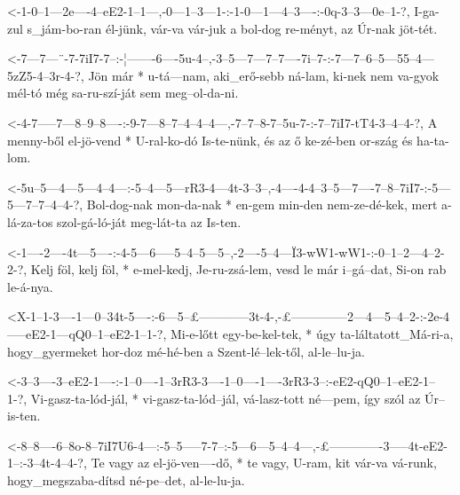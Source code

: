 
  {<-1-0--1---2e----4--eE2-1--1---,-0---1--3---1-:-1-0---1---4--3----:-0q-3--3---0e--1-?,}
  {  I-ga-zul s_jám-bo-ran él-jünk, vár-va vár-juk a bol-dog re-ményt, az Úr-nak jöt-tét.}

  {<-7---7---¨-7-7iI7-7--:-¦-------6----5u-4--,-3--5---7---7--7----7i--7-:-7---7--6--5---55--4---5zZ5-4--3r-4-?,}
  {  Jön már * u-tá---nam, aki_erő-sebb ná-lam, ki-nek nem va-gyok mél-tó  még sa-ru-szí-ját sem meg--ol-da-ni.}


  {<-4-7-----7---8--9--8----:-9-7---8--7--4--4--4---,-7--7--8-7--5u-7-:-7--7iI7-tT4-3--4--4-?,}
  {  A menny-ből el-jö-vend * U-ral-ko-dó Is-te-nünk, és az ő ke-zé-ben or-szág és  ha-ta-lom.}

  {<-5u--5---4---5---4--4---:-5--4---5---rR3-4---4t-3--3--,-4----4-4--3--5---7----7--8--7iI7-:-5---5---7--7--4--4-?,}
  {  Bol-dog-nak mon-da-nak * en-gem min-den nem-ze-dé-kek, mert a-lá-za-tos szol-gá-ló-ját    meg-lát-ta az Is-ten.}


  {<-1----2----4t---5----:-4-5---6-----5--4--5---5--,-2----5--4---Ï3-wW1-wW1-:-0--1--2---4--2-2-?,}
  {  Kelj föl, kelj föl, * e-mel-kedj, Je-ru-zsá-lem, vesd le már i--gá--dat,  Si-on rab le-á-nya.}

  {<X-1--1-3----1---0--34t-5----:-6---5--£------------3t-4-,-£--------------2---4---5--4--2-:-2e-4-----eE2-1---qQ0--1--eE2-1--1-?,}
  {   Mi-e-lőtt egy-be-kel-tek, * úgy ta-láltatott_Má-ri-a,  hogy_gyermeket hor-doz mé-hé-ben a  Szent-lé--lek-től, al-le--lu-ja.}


  {<-3--3----3--eE2-1----:-1--0----1--3rR3-3----1--0----1----3rR3-3--:-eE2-qQ0--1--eE2-1--1-?,}
  {  Vi-gasz-ta-lód-jál, * vi-gasz-ta-lód--jál, vá-lasz-tott né---pem, így szól az Úr--is-ten.}

  {<-8--8----6--8o-8--7iI7U6-4---:-5--5-----7-7--:-5---6---5--4--4---,-£-------------3-----4t-eE2-1--:-3--4t-4--4-?,}
  {  Te vagy az el-jö-ven----dő, * te vagy, U-ram, kit vár-va vá-runk, hogy_megszaba-dítsd né-pe--det, al-le-lu-ja.}

